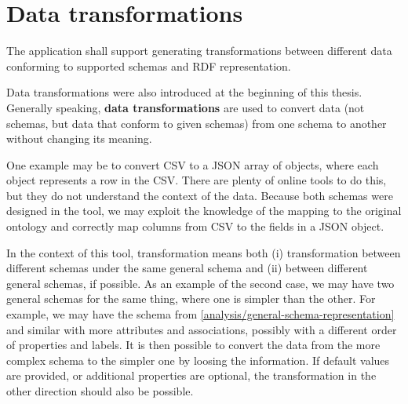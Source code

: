 \section{Data transformations}

\begin{requirement}
    The application shall support generating transformations between different data conforming to supported schemas and RDF representation.
    \label{req:transformations}
\end{requirement}

Data transformations were also introduced at the beginning of this thesis. Generally speaking, \textbf{data transformations} are used to convert data (not schemas, but data that conform to given schemas) from one schema to another without changing its meaning.

One example may be to convert CSV to a JSON array of objects, where each object represents a row in the CSV. There are plenty of online tools to do this, but they do not understand the context of the data. Because both schemas were designed in the tool, we may exploit the knowledge of the mapping to the original ontology and correctly map columns from CSV to the fields in a JSON object.

In the context of this tool, transformation means both (i) transformation between different schemas under the same general schema and (ii) between different general schemas, if possible. As an example of the second case, we may have two general schemas for the same thing, where one is simpler than the other. For example, we may have the schema from \autoref{analysis/general-schema-representation} and similar with more attributes and associations, possibly with a different order of properties and labels. It is then possible to convert the data from the more complex schema to the simpler one by loosing the information. If default values are provided, or additional properties are optional, the transformation in the other direction should also be possible.

\medskip

